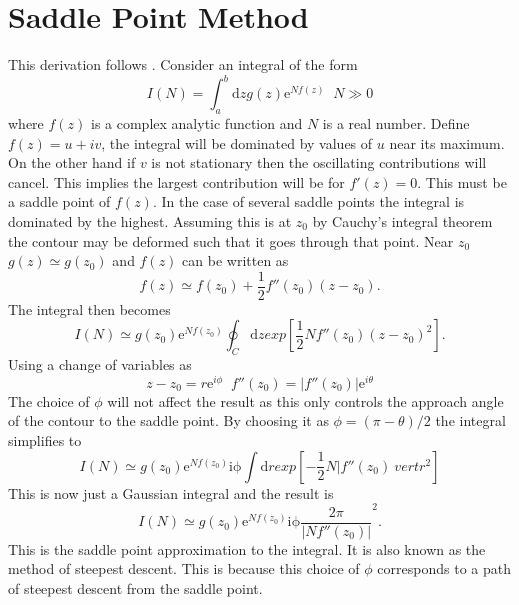 
\chapter{Saddle Point Method} %

\label{AppendixB} %


This derivation follows \citep{MOMP}. Consider an integral of the form
\begin{equation}
I(N) = \int_a^b\mathrm{d}z g(z)\mathrm{e}^{Nf(z)} \; \; N \gg 0
\end{equation}
where $f(z)$ is a complex analytic function and $N$ is a real number. Define $f(z) = u +iv$, the integral will be dominated by values of $u$ near its maximum. On the other hand if $v$ is not stationary then the oscillating contributions will cancel. This implies the largest contribution will be for $f'(z)=0$. This must be a saddle point of $f(z)$. In the case of several saddle points the integral is dominated by the highest. Assuming this is at $z_0$ by Cauchy's integral theorem the contour may be deformed such that it goes through that point. Near $z_0$ $g(z) \simeq  g(z_0)$ and $f(z)$ can be written as 
\begin{equation}
f(z) \simeq f(z_0)+ \frac{1}{2} f''(z_0)(z-z_0).
\end{equation}
The integral then becomes
\begin{equation}
I(N) \simeq g(z_0)\mathrm{e}^{Nf(z_0)} \oint_C\mathrm{d}z exp\left[\frac{1}{2}Nf''(z_0)(z-z_0)^2\right].
\end{equation}
Using a change of variables as
 \begin{equation*}
z-z_0 = r\mathrm{e}^{i\phi} \;\; f''(z_0) = \vert f''(z_0) \vert \mathrm{e}^{i\theta}
\end{equation*}
The choice of $\phi$ will not affect the result as this only controls the approach angle of the contour to the saddle point. By choosing it as $\phi = (\pi - \theta)/2$ the integral simplifies to
\begin{equation}
I(N) \simeq g(z_0)\mathrm{e}^{Nf(z_0)}\mathrm{i\phi} \int\mathrm{d}r exp\left[-\frac{1}{2}N\vert f''(z_0)\ vert r^2\right]
\end{equation}
This is now just a Gaussian integral and the result is
\begin{equation}
I(N) \simeq g(z_0)\mathrm{e}^{Nf(z_0)}\mathrm{i\phi} \frac{2\pi}{\vert Nf''(z_0)\vert}^2.
\end{equation}
This is the saddle point approximation to the integral. It is also known as the method of steepest descent. This is because this choice of $\phi$ corresponds to a path of steepest descent from the saddle point.
